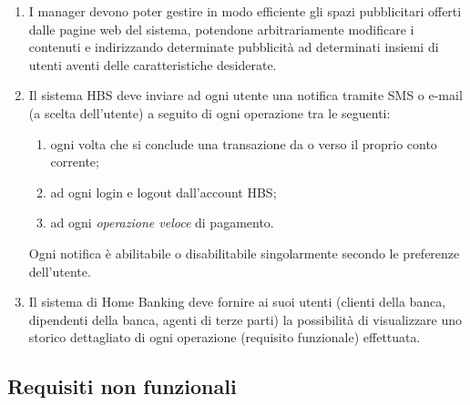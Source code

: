 \begin{enumerate}
\begin{enumerate}
			\item costo del pacchetto;
			\item valore garantito di vendita del pacchetto;
			\item percentuale di guadagno della banca alla vendita del pacchetto.
		\end{enumerate}
		I pacchetti di investimento vengono acquistati dai clienti della banca e formano un \emph{portafoglio di investimento}.
	\item I manager devono poter gestire in modo efficiente gli spazi pubblicitari offerti dalle pagine web del sistema, potendone arbitrariamente modificare i contenuti e indirizzando determinate pubblicità ad determinati insiemi di utenti aventi delle caratteristiche desiderate.
	\item Il sistema HBS deve inviare ad ogni utente una notifica tramite SMS o e-mail (a scelta dell'utente) a seguito di ogni operazione tra le seguenti:
		\begin{enumerate}
			\item ogni volta che si conclude una transazione da o verso il proprio conto corrente;
			\item ad ogni login e logout dall'account HBS;
			\item ad ogni \emph{operazione veloce} di pagamento.
		\end{enumerate}
	Ogni notifica \`e abilitabile o disabilitabile singolarmente secondo le preferenze dell'utente.
	\item Il sistema di Home Banking deve fornire ai suoi utenti (clienti della banca, dipendenti della banca, agenti di terze parti) la possibilit\`a di visualizzare uno storico dettagliato di ogni operazione (requisito funzionale) effettuata.
\end{enumerate}

\subsection{Requisiti non funzionali}

